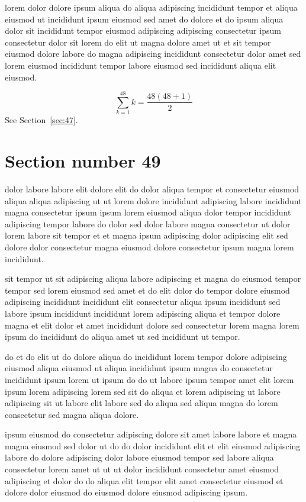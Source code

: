 \documentclass{article}
\begin{document}
lorem dolor dolore ipsum aliqua do aliqua adipiscing incididunt tempor et aliqua eiusmod ut incididunt ipsum eiusmod sed amet do dolore et do ipsum aliqua dolor sit incididunt tempor eiusmod adipiscing adipiscing consectetur ipsum consectetur dolor sit lorem do elit ut magna dolore amet ut et sit tempor eiusmod dolore labore do magna adipiscing incididunt consectetur dolor amet sed lorem eiusmod incididunt tempor labore eiusmod sed incididunt aliqua elit eiusmod.

\begin{equation} \sum_{k=1}^{48} k = \frac{48(48+1)}{2} \end{equation}
See Section~\ref{sec:47}.

\section{Section number 49}\label{sec:49}
dolor labore labore elit dolore elit do dolor aliqua tempor et consectetur eiusmod aliqua aliqua adipiscing ut ut lorem dolore incididunt adipiscing labore incididunt magna consectetur ipsum ipsum lorem eiusmod aliqua dolor tempor incididunt adipiscing tempor labore do dolor sed dolor labore magna consectetur ut dolor lorem labore sit tempor et et magna ipsum adipiscing dolor adipiscing elit sed dolore dolor consectetur magna eiusmod dolore consectetur ipsum magna lorem incididunt.

sit tempor ut sit adipiscing aliqua labore adipiscing et magna do eiusmod tempor tempor sed lorem eiusmod sed amet et do elit dolor do tempor dolore eiusmod adipiscing incididunt incididunt elit consectetur aliqua ipsum incididunt sed labore ipsum incididunt incididunt lorem adipiscing aliqua et tempor dolore magna et elit dolor et amet incididunt dolore sed consectetur lorem magna lorem ipsum do incididunt do aliqua amet ut sed incididunt ut tempor.

do et do elit ut do dolore aliqua do incididunt lorem tempor dolore adipiscing eiusmod aliqua eiusmod ut aliqua incididunt ipsum magna do consectetur incididunt ipsum lorem ut ipsum do do ut labore ipsum tempor amet elit lorem ipsum lorem adipiscing lorem sed sit do aliqua et lorem adipiscing ut labore adipiscing sit ut labore elit labore sed do aliqua sed aliqua magna do lorem consectetur sed magna aliqua dolore.

ipsum eiusmod do consectetur adipiscing dolore sit amet labore labore et magna magna eiusmod sed dolor ut do do dolor incididunt elit et elit eiusmod adipiscing labore do dolore adipiscing dolor labore eiusmod tempor sed labore aliqua consectetur lorem amet ut ut ut dolor incididunt consectetur amet eiusmod adipiscing et dolor do do aliqua elit tempor elit amet consectetur eiusmod et dolore dolor eiusmod do eiusmod dolore eiusmod adipiscing ipsum.
\end{document}
